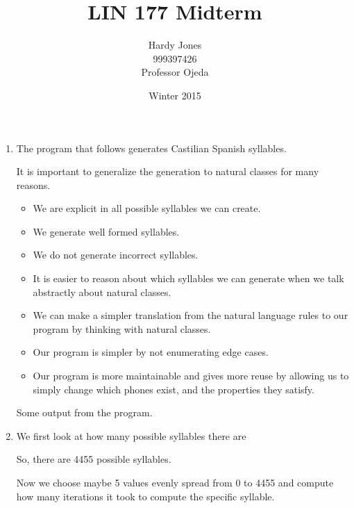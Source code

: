 \documentclass[12pt,letterpaper]{article}
\title{LIN 177 Midterm\vspace{-2ex}}
\author{Hardy Jones\\
        999397426\\
        Professor Ojeda\vspace{-2ex}}
\date{Winter 2015}
\begin{document}
  \maketitle


  \begin{enumerate}
    \item
      The program that follows generates Castilian Spanish syllables.

      It is important to generalize the generation to natural classes for many reasons.
      \begin{itemize}
        \item We are explicit in all possible syllables we can create.
        \item We generate well formed syllables.
        \item We do not generate incorrect syllables.
        \item It is easier to reason about which syllables we can generate when we talk abstractly about natural classes.
        \item We can make a simpler translation from the natural language rules to our program by thinking with natural classes.
        \item Our program is simpler by not enumerating edge cases.
        \item Our program is more maintainable and gives more reuse by allowing us to simply change which phones exist, and the properties they satisfy.
      \end{itemize}

      Some output from the program.



    \item
      We first look at how many possible syllables there are


      So, there are 4455 possible syllables.

      Now we choose maybe 5 values evenly spread from 0 to 4455 and compute how many iterations it took to compute the specific syllable.



\end{enumerate}
\end{document}
